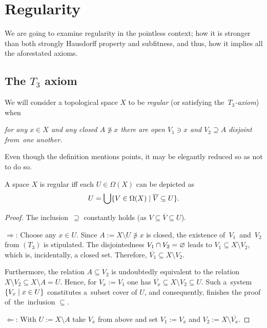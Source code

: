 \chapter{Regularity}

We are going to examine regularity in the pointless context;
how it is stronger than both strongly Hausdorff property and subfitness, and
thus, how it implies all the aforestated axioms.

\section{The $T_3$ axiom}

\begin{framed}
  \begin{df}[$T_3$]
    We will consider a topological space $X$ to be \emph{regular\/} (or
    satisfying the~\emph{$T_3$-axiom\/}) when
    \begin{center} \it
      for any $x\in X$ and any closed $A \not\owns x$ there are open $V_1\owns
      x$ and $V_2\supseteq A$ disjoint from~one another.
    \end{center}
  \end{df}
\end{framed}

Even though the definition mentions points, it may be elegantly reduced so as
not to do so.

\begin{prop} \label{reg-char}
  A space $X$ is regular iff each $U\in \Omega(X)$ can be depicted as
  \[
    U = \bigcup \{V\in \Omega(X) \mid \overline{V} \subseteq U\}.
  \]
\end{prop}
\begin{proof}
  The inclusion~$\supseteq$ constantly holds (as $V\subseteq
  \overline{V}\subseteq U$).

  $\Rightarrow$:
  Choose any $x\in U$.
  Since $A := X\setminus U \not\owns x$ is closed, the existence
  of~$V_1$~and~$V_2$ from $(T_3)$ is stipulated.
  The disjointedness $V_1 \cap V_2 = \varnothing$ leads to $V_1\subseteq X\setminus
  V_2$, which is, incidentally, a closed set.
  Therefore, $\overline{V_1}\subseteq X\setminus V_2$.

  Furthermore, the relation $A\subseteq V_2$ is undoubtedly equivalent to the
  relation $X\setminus V_2\subseteq X \setminus A = U$.
  Hence, for $V_x := V_1$ one has $\overline{V_x}\subseteq X\setminus V_2\subseteq
  U$.
  Such a~system $\{V_x \mid x\in U\}$ constitutes a~subset cover of $U$, and
  consequently, finishes the proof of~the~inclusion $\subseteq$.

  $\Leftarrow$:
  With $U := X\setminus A$ take $V_x$ from above and set $V_1 := V_x$ and $V_2
  := X\setminus \overline{V_x}$.
\end{proof}

